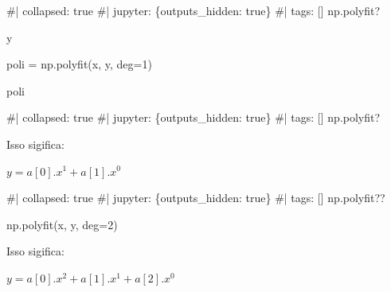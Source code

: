 \documentclass[
  letterpaper,
  DIV=11,
  numbers=noendperiod]{scrreprt}
\newenvironment{Shaded}{\begin{snugshade}}{\end{snugshade}}
\newcommand{\NormalTok}[1]{\textcolor[rgb]{0.00,0.23,0.31}{#1}}
\begin{document}
\begin{Shaded}
\begin{Highlighting}[]
\NormalTok{\#| collapsed: true}
\NormalTok{\#| jupyter: \{outputs\_hidden: true\}}
\NormalTok{\#| tags: []}
\NormalTok{np.polyfit?}
\end{Highlighting}
\end{Shaded}

\begin{Shaded}
\begin{Highlighting}[]
\NormalTok{y}
\end{Highlighting}
\end{Shaded}

\begin{Shaded}
\begin{Highlighting}[]
\NormalTok{poli = np.polyfit(x, y, deg=1)}
\end{Highlighting}
\end{Shaded}

\begin{Shaded}
\begin{Highlighting}[]
\NormalTok{poli}
\end{Highlighting}
\end{Shaded}

\begin{Shaded}
\begin{Highlighting}[]
\NormalTok{\#| collapsed: true}
\NormalTok{\#| jupyter: \{outputs\_hidden: true\}}
\NormalTok{\#| tags: []}
\NormalTok{np.polyfit?}
\end{Highlighting}
\end{Shaded}

Isso sigifica:

\(y = a[0].x^1 + a[1].x^0\)

\begin{Shaded}
\begin{Highlighting}[]
\NormalTok{\#| collapsed: true}
\NormalTok{\#| jupyter: \{outputs\_hidden: true\}}
\NormalTok{\#| tags: []}
\NormalTok{np.polyfit??}
\end{Highlighting}
\end{Shaded}

\begin{Shaded}
\begin{Highlighting}[]
\NormalTok{np.polyfit(x, y, deg=2)}
\end{Highlighting}
\end{Shaded}

Isso sigifica:

\(y = a[0].x^2 + a[1].x^1 + a[2].x^0\)
\end{document}
